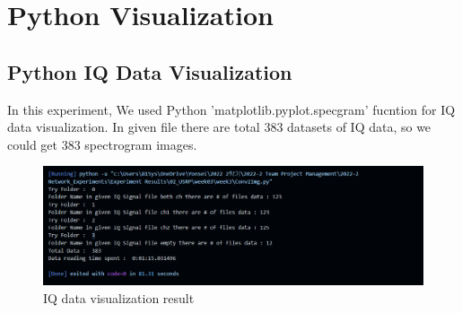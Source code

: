 \section{Python Visualization}
\subsection{Python IQ Data Visualization}
    In this experiment, We used Python 'matplotlib.pyplot.specgram' fucntion for IQ data visualization.
    In given file there are total 383 datasets of IQ data, so we could get 383 spectrogram images. \\
    \vspace{-4mm}  
    \begin{figure}[!h]\raggedleft
    \hspace{15mm}
		\includegraphics[width=.95\textwidth]{image/week03/1-2-1.png}
		\caption{\footnotesize IQ data visualization result}
		\vspace{-10pt}
    \end{figure}
\clearpage